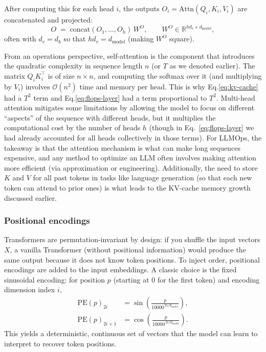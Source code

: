 After computing this for each head $i$, the outputs
$O_i = \mathrm{Attn}(Q_i,K_i,V_i)$ are concatenated and projected:
\begin{equation}
  O \;=\; \mathrm{concat}(O_1,\ldots,O_h)\, W^{O},
  \qquad
  W^{O} \in \mathbb{R}^{h d_v \times d_{\text{model}}},
\end{equation}
often with $d_v = d_k$ so that $h d_v = d_{\text{model}}$ (making $W^{O}$ square).


From an operations perspective, self-attention is the component that introduces the quadratic complexity in sequence length $n$ (or $T$ as we denoted earlier). The matrix $Q_i K_i^\top$ is of size $n \times n$, and computing the softmax over it (and multiplying by $V_i$) involves $\mathcal{O}(n^2)$ time and memory per head. This is why Eq.\ref{eq:kv-cache} had a $T^2$ term and Eq.\ref{eq:flops-layer} had a term proportional to $T^2$. Multi-head attention mitigates some limitations by allowing the model to focus on different “aspects” of the sequence with different heads, but it multiplies the computational cost by the number of heads $h$ (though in Eq.~\ref{eq:flops-layer} we had already accounted for all heads collectively in those terms). For LLMOps, the takeaway is that the attention mechanism is what can make long sequences expensive, and any method to optimize an LLM often involves making attention more efficient (via approximation or engineering). Additionally, the need to store $K$ and $V$ for all past tokens in tasks like language generation (so that each new token can attend to prior ones) is what leads to the KV-cache memory growth discussed earlier.

\subsubsection{Positional encodings}
Transformers are permutation-invariant by design: if you shuffle the input vectors $X$, a vanilla Transformer (without positional information) would produce the same output because it does not know token positions. To inject order, positional encodings are added to the input embeddings. A classic choice is the fixed sinusoidal encoding: for position $p$ (starting at $0$ for the first token) and encoding dimension index $i$,
\begin{align}
  \mathrm{PE}(p)_{2i}   &= \sin\!\left(\frac{p}{10000^{\,2i/d_{\text{model}}}}\right), \\
  \mathrm{PE}(p)_{2i+1} &= \cos\!\left(\frac{p}{10000^{\,2i/d_{\text{model}}}}\right).
\end{align}
This yields a deterministic, continuous set of vectors that the model can learn to interpret to recover token positions.

